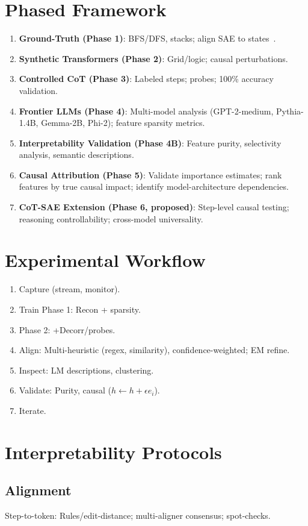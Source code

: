 \documentclass{article}
\begin{document}
\section{Phased Framework}
\begin{enumerate}
\item \textbf{Ground-Truth (Phase 1)}: BFS/DFS, stacks; align SAE to states~\citep{SAE-Monosemantic}.
\item \textbf{Synthetic Transformers (Phase 2)}: Grid/logic; causal perturbations.
\item \textbf{Controlled CoT (Phase 3)}: Labeled steps; probes; 100\% accuracy validation.
\item \textbf{Frontier LLMs (Phase 4)}: Multi-model analysis (GPT-2-medium, Pythia-1.4B, Gemma-2B, Phi-2); feature sparsity metrics.
\item \textbf{Interpretability Validation (Phase 4B)}: Feature purity, selectivity analysis, semantic descriptions.
\item \textbf{Causal Attribution (Phase 5)}: Validate importance estimates; rank features by true causal impact; identify model-architecture dependencies.
\item \textbf{CoT-SAE Extension (Phase 6, proposed)}: Step-level causal testing; reasoning controllability; cross-model universality.
\end{enumerate}

\section{Experimental Workflow}
\begin{enumerate}
\item Capture (stream, monitor).
\item Train Phase 1: Recon + sparsity.
\item Phase 2: +Decorr/probes.
\item Align: Multi-heuristic (regex, similarity), confidence-weighted; EM refine.
\item Inspect: LM descriptions, clustering.
\item Validate: Purity, causal ($h \leftarrow h + \epsilon e_i$).
\item Iterate.
\end{enumerate}

\section{Interpretability Protocols}
\subsection{Alignment}
Step-to-token: Rules/edit-distance; multi-aligner consensus; spot-checks.
\end{document}
